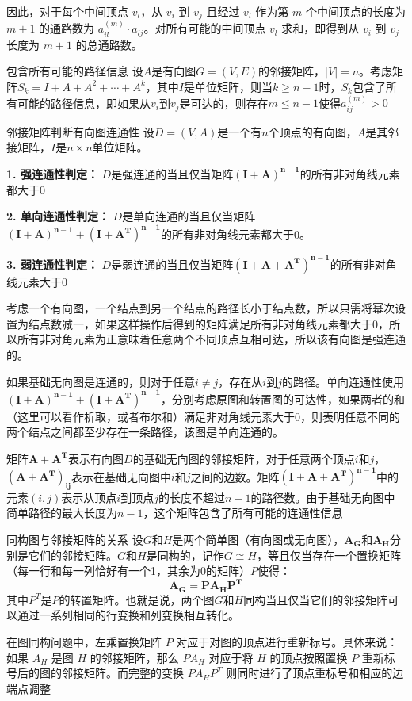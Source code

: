 因此，对于每个中间顶点 $v_l$，从 $v_i$ 到 $v_j$ 且经过 $v_l$ 作为第 $m$ 个中间顶点的长度为 $m+1$ 的通路数为 $a_{il}^{(m)} \cdot a_{lj}$。对所有可能的中间顶点 $v_l$ 求和，即得到从 $v_i$ 到 $v_j$ 长度为 $m+1$ 的总通路数。
\begin{theorem}{包含所有可能的路径信息}{}
    设$A$是有向图$G=(V,E)$的邻接矩阵，$|V|=n$。考虑矩阵$S_k = I + A + A^2 + \cdots + A^k$，其中$I$是单位矩阵，则当$k \geqslant n-1$时，$S_k$包含了所有可能的路径信息，即如果从$v_i$到$v_j$是可达的，则存在$m \leqslant n-1$使得$a_{ij}^{(m)} > 0$
\end{theorem}
\begin{theorem}{邻接矩阵判断有向图连通性}{}
设$D=(V,A)$是一个有$n$个顶点的有向图，$A$是其邻接矩阵，$I$是$n\times n$单位矩阵。

\textbf{1. 强连通性判定：}
$D$是强连通的当且仅当矩阵$\bm{(I+A)^{n-1}}$的所有非对角线元素都大于0

\textbf{2. 单向连通性判定：}
$D$是单向连通的当且仅当矩阵$\bm{(I+A)^{n-1} + (I+A^T)^{n-1}}$的所有非对角线元素都大于0。


\textbf{3. 弱连通性判定：}
$D$是弱连通的当且仅当矩阵$\bm{(I+A+A^T)^{n-1}}$的所有非对角线元素大于0
\end{theorem}
考虑一个有向图，一个结点到另一个结点的路径长小于结点数，所以只需将幂次设置为结点数减一，如果这样操作后得到的矩阵满足所有非对角线元素都大于0，所以所有非对角元素为正意味着任意两个不同顶点互相可达，所以该有向图是强连通的。

如果基础无向图是连通的，则对于任意$i \neq j$，存在从$i$到$j$的路径。单向连通性使用$\bm{(I+A)^{n-1} + (I+A^T)^{n-1}}$，分别考虑原图和转置图的可达性，如果两者的和（这里可以看作析取，或者布尔和）满足非对角线元素大于0，则表明任意不同的两个结点之间都至少存在一条路径，该图是单向连通的。

矩阵$\bm{A+A^T}$表示有向图$D$的基础无向图的邻接矩阵，对于任意两个顶点$i$和$j$，$\bm{(A+A^T)_{ij}}$表示在基础无向图中$i$和$j$之间的边数。矩阵$\bm{(I+A+A^T)^{n-1}}$中的元素$(i,j)$表示从顶点$i$到顶点$j$的长度不超过$n-1$的路径数。由于基础无向图中简单路径的最大长度为$n-1$，这个矩阵包含了所有可能的连通性信息
\begin{theorem}{同构图与邻接矩阵的关系}{}
设$G$和$H$是两个简单图（有向图或无向图），$\bm{A_G}$和$\bm{A_H}$分别是它们的邻接矩阵。$G$和$H$是同构的，记作$G \cong H$，等且仅当存在一个置换矩阵（每一行和每一列恰好有一个1，其余为0的矩阵）$P$使得：
\[
\bm{A_G = P A_H P^T}
\]
其中$P^T$是$P$的转置矩阵。也就是说，两个图$G$和$H$同构当且仅当它们的邻接矩阵可以通过一系列相同的行变换和列变换相互转化。
\end{theorem}
在图同构问题中，左乘置换矩阵 $P$ 对应于对图的顶点进行重新标号。具体来说：如果 $A_H$ 是图 $H$ 的邻接矩阵，那么 $PA_H$ 对应于将 $H$ 的顶点按照置换 $P$ 重新标号后的图的邻接矩阵。而完整的变换 $PA_HP^T$ 则同时进行了顶点重标号和相应的边端点调整

